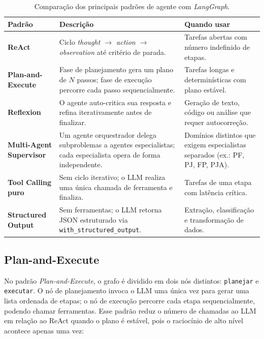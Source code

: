 \begin{table}[htbp]
\centering
\caption{Compara\c{c}\~ao dos principais padr\~oes de agente com \textit{LangGraph}.}
\label{tab:padroes_agentes}
\begin{tabular}{p{3.2cm} p{5.2cm} p{5.0cm}}
\toprule
\textbf{Padr\~ao} & \textbf{Descri\c{c}\~ao} & \textbf{Quando usar} \\
\midrule
\textbf{ReAct} & Ciclo \textit{thought $\to$ action $\to$ observation} at\'e crit\'erio de parada. & Tarefas abertas com n\'umero indefinido de etapas. \\
\addlinespace
\textbf{Plan-and-Execute} & Fase de planejamento gera um plano de $N$ passos; fase de execu\c{c}\~ao percorre cada passo sequencialmente. & Tarefas longas e determin\'isticas com plano est\'avel. \\
\addlinespace
\textbf{Reflexion} & O agente auto-critica sua resposta e refina iterativamente antes de finalizar. & Gera\c{c}\~ao de texto, c\'odigo ou an\'alise que requer autocorre\c{c}\~ao. \\
\addlinespace
\textbf{Multi-Agent Supervisor} & Um agente orquestrador delega subproblemas a agentes especialistas; cada especialista opera de forma independente. & Dom\'inios distintos que exigem especialistas separados (ex.: PF, PJ, FP, PJA). \\
\addlinespace
\textbf{Tool Calling puro} & Sem ciclo iterativo; o LLM realiza uma \'unica chamada de ferramenta e finaliza. & Tarefas de uma etapa com lat\^encia cr\'itica. \\
\addlinespace
\textbf{Structured Output} & Sem ferramentas; o LLM retorna JSON estruturado via \texttt{with\_structured\_output}. & Extra\c{c}\~ao, classifica\c{c}\~ao e transforma\c{c}\~ao de dados. \\
\bottomrule
\end{tabular}
\end{table}

\subsection{Plan-and-Execute}

No padr\~ao \textit{Plan-and-Execute}, o grafo \'e dividido em dois n\'os
distintos: \texttt{planejar} e \texttt{executar}. O n\'o de planejamento
invoca o LLM uma \'unica vez para gerar uma lista ordenada de etapas; o
n\'o de execu\c{c}\~ao percorre cada etapa sequencialmente, podendo chamar
ferramentas. Esse padr\~ao reduz o n\'umero de chamadas ao LLM em rela\c{c}\~ao
ao ReAct quando o plano \'e est\'avel, pois o racioc\'inio de alto n\'ivel
acontece apenas uma vez:

